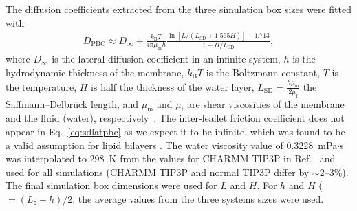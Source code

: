 \documentclass[journal=jctcce]{achemso}
\begin{document}
The diffusion coefficients extracted from the three simulation box sizes were fitted with
%
\begin{align}
	D_\mathrm{PBC}\approx D_\infty+\frac{k_\mathrm{B}T}{4\pi\mu_\mathrm{m}h}\frac{\ln\left[L/\left(L_\mathrm{SD}+1.565H\right)\right]-1.713}{1+H/L_\mathrm{SD}},
	\label{eq:sdlatpbc}
\end{align}
%
where $D_\infty$ is the lateral diffusion coefficient in an infinite system, $h$ is the hydrodynamic thickness of the membrane, $k_\mathrm{B}T$ is the Boltzmann constant, $T$ is the temperature, $H$ is half the thickness of the water layer, $L_\mathrm{SD}=\frac{h\mu_\mathrm{m}}{2\mu_\mathrm{f}}$ the Saffmann--Delbr\"{u}ck length, and $\mu_\mathrm{m}$ and $\mu_\mathrm{f}$ are shear viscosities of the membrane and the fluid (water), respectively~\cite{vogele2018hydrodynamics}. The inter-leaflet friction coefficient does not appear in Eq.~\eqref{eq:sdlatpbc} as we expect it to be infinite, which was found to be a valid assumption for lipid bilayers \cite{vogele2018hydrodynamics}. The water viscosity value of 0.3228~mPa$\cdot$s was interpolated to 298~K from the values for CHARMM TIP3P in Ref.~ and used for all simulations (CHARMM TIP3P and normal TIP3P differ by $\sim$2--3\%). The final simulation box dimensions were used for $L$ and $H$. For $h$ and $H$ ($=(L_z-h)/2$, the average values from the three systems sizes were used. 
\end{document}
